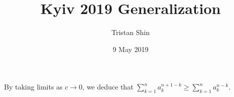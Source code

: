 \documentclass[a4paper, 12pt]{article}
\title{Kyiv 2019 Generalization}
\author{Tristan Shin}
\date{9 May 2019}
\begin{document}
\maketitle


\hrulefill

\begin{solution}
\end{solution}

\begin{remark}
By taking limits as $c\to0$, we deduce that $\displaystyle\sum_{k=1}^na_k^{n+1-k}\geq\sum_{k=1}^na_k^{n-k}$.
\end{remark}
\end{document}
